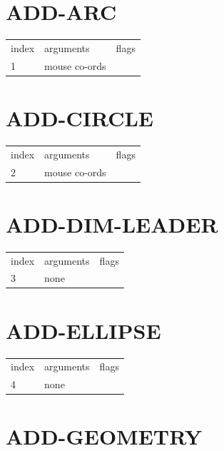 \documentclass[10pt]{report}
\begin{document}
\section{ADD-ARC}

\begin{center}
\begin{tabular}{l | l | l}
index & arguments & flags \\
1 & mouse co-ords & 
\end{tabular}
\end{center}

\section{ADD-CIRCLE}

\begin{center}
\begin{tabular}{l | l | l}
index & arguments & flags \\
2 & mouse co-ords & 
\end{tabular}
\end{center}

\section{ADD-DIM-LEADER}

\begin{center}
\begin{tabular}{l | l | l}
index & arguments & flags \\
3 & none & 
\end{tabular}
\end{center}

\section{ADD-ELLIPSE}

\begin{center}
\begin{tabular}{l | l | l}
index & arguments & flags \\
4 & none & 
\end{tabular}
\end{center}

\section{ADD-GEOMETRY}
\end{document}
